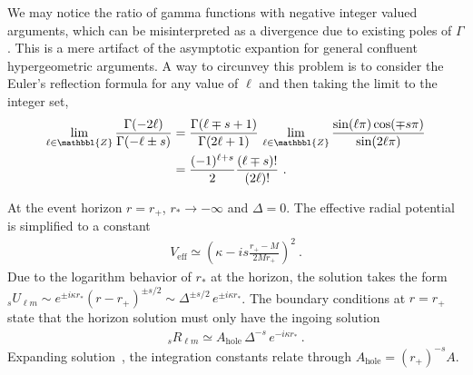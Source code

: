 We may notice the ratio of gamma functions with negative integer valued arguments, which can be misinterpreted as a divergence due to existing poles of $\Gamma$.
This is a mere artifact of the asymptotic expantion for general confluent hypergeometric arguments.
A way to circunvey this problem is to consider the Euler's reflection formula for any value of $\ell$ and then taking the limit to the integer set,
\begin{align}
    \label{eq3:negativeGammaRatio}
    \begin{split}
        \lim_{\ell\in\mathbbl{Z}} \frac{\Gamma(-2\ell)}{\Gamma(-\ell\pm s)} &= \frac{\Gamma(\ell\mp s+1)}{\Gamma(2\ell+1)} \, \lim_{\ell\in\mathbbl{Z}} \frac{\sin(\ell\pi)\cos(\mp s \pi)}{\sin(2\ell\pi)} \\
        &= \frac{(-1)^{\ell+s}}{2} \frac{(\ell \mp s)!}{(2\ell)!} ~.
    \end{split}
\end{align}
 
At the event horizon $r=r_+$, $r_*\to-\infty$ and $\Delta=0$.
The effective radial potential is simplified to a constant
\begin{align}
    V_\mathrm{eff} \simeq \left( \kappa- i s \frac{r_+ - M}{2 M r_+} \right)^2 ~.
\end{align}
Due to the logarithm behavior of $r_*$ at the horizon, the solution takes the form ${}_{s}U_{\ell m}\sim e^{\pm i \kappa r_{*} } (r-r_{+})^{\pm s/2} \sim \Delta^{\pm s/2} \,e^{\pm i \kappa r_{*} }$. The boundary conditions at $r=r_{+}$ state that the horizon solution must only have the ingoing solution
\begin{align}
    \label{eq3:boundaryR}
    {}_{s}R_{\ell m} \simeq A_\mathrm{hole} \,\Delta^{-s} \,e^{- i \kappa r_{*} } ~.
\end{align}
Expanding solution~, the integration constants relate through $A_\mathrm{hole} = (r_{+})^{-s} A$.

